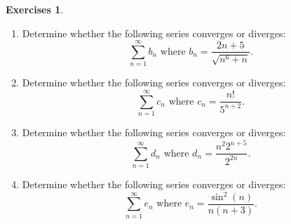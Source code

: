 \documentclass[extrafontsizes, twoside, a4paper]{memoir}
\theoremstyle{plain}%
\theoremstyle{definition}
\newtheorem{exer}{Exercises}[chapter]
\theoremstyle{remark}
\newcommand{\solution}[1]{}
\begin{document}
\begin{exer}
\begin{enumerate}
\item
Determine whether the following series converges or diverges:
$$\sum_{n=1}^\infty b_n \mbox{ where } b_n =  \frac{2n+5}{\sqrt{n^6 +n}}.$$
\solution{Square roots can be awkward to deal with in inequalities. Often better to use the limit comparison tests. Examining the ration of highest powers int he numerator and denominator suggests using the comparison series $\sum \frac{n}{n^3} = \sum \frac{1}{n^2}$.
\begin{align*}
\lim_{n \to \infty}  \frac{2n+5}{\sqrt{n^6 +n}} \frac{1}{\frac{1}{n^2}}
& = \lim_{n \to \infty} \frac{2n^3+5n^2}{\sqrt{n^6 +n}} \\
&= \lim_{n \to \infty} \frac{2 + \frac{5}{n}}{\frac{1}{n^3} \sqrt{n^6 +n}} \\
&=  \lim_{n \to \infty}  \frac{2 + \frac{5}{n}}{\sqrt{1 +\frac{1}{n^5}}} \\
&=2
\end{align*}
So since the limit of the ratios exists we conclude by the limit comparison test that $\sum b_n$ converges as $\sum \frac{1}{n^2}$ converges.}

\item
Determine whether the following series converges or diverges:
$$\sum_{n=1}^\infty c_n  \mbox{ where } c_n =  \frac{n!}{5^{n+2}}.$$
\solution{Use the ratio test.
$$ \lim_{n \to \infty} \frac{c_{n+1}}{c_n} =
\lim_{n \to \infty} \frac{(n+1)!}{5^{n+3}} \frac{5^{n+2}}{n!}
= \lim_{n \to \infty} \frac{n+1}{5},$$
which is clearly divergent as it increases without upper-bound. So by the ratio test the series $\sum c_n$ is divergent.}

\item
Determine whether the following series converges or diverges:
$$\sum_{n=1}^\infty d_n \mbox{ where } d_n=  \frac{n^2 2^{n+5}}{2^{2n}}.$$

\solution{Use the ratio test.
\begin{align*}
\lim_{n \to \infty} \frac{d_{n+1}}{d_n} &=
\lim_{n \to \infty} \frac{(n+1)^2 2^{n+6}}{2^{2n+2}}\frac{2^{2n}}{n^2 2^{n+5}} \\
&= \lim_{n \to \infty} \frac{1}{2} \frac{(n+1)^2}{n^2} \\
&= \lim_{n \to \infty} \frac{1}{2} \left ( 1 + \frac{1}{n} \right )^2 \\
&= \frac{1}{2}.
\end{align*}
Since the limit is strictly less than 1 we conclude by the ratio test that $\sum d_n$ is convergent.}

\item
Determine whether the following series converges or diverges:
$$ \sum_{n=1}^\infty e_n \mbox{ where } e_n=  \frac{\sin^2{(n)}}{n(n+3)}.$$


\end{enumerate}
\end{exer}
\end{document}
